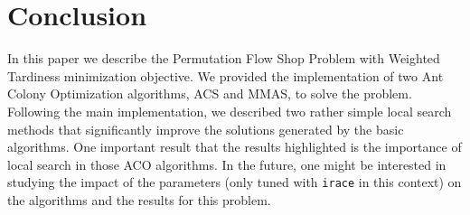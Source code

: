 \documentclass[runningheads]{llncs}
\begin{document}
\section{Conclusion}


In this paper we describe the Permutation Flow Shop Problem with Weighted Tardiness minimization objective. We provided the implementation of two Ant Colony Optimization algorithms, ACS and MMAS, to solve the problem. Following the main implementation, we described two rather simple local search methods that significantly improve the solutions generated by the basic algorithms. One important result that the results highlighted is the importance of local search in those ACO algorithms. In the future, one might be interested in studying the impact of the parameters (only tuned with \texttt{irace} in this context) on the algorithms and the results for this problem.



\end{document}
